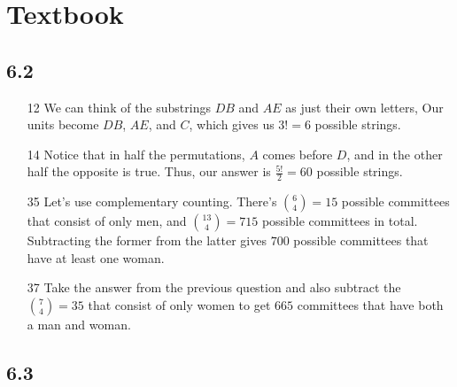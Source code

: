 \documentclass[12pt]{article}
\begin{document}
\section{Textbook}\label{sec:textbook}

\subsection*{6.2}\label{sec:6.2}

\begin{enumerate}
    \item[12] We can think of the substrings $DB$ and $AE$ as just their own letters,
        Our units become $DB$, $AE$, and $C$, which gives us $3! = \boxed{6}$ possible strings.
    \item[14] Notice that in half the permutations, $A$ comes before $D$, and in the other half the opposite is true.
        Thus, our answer is $\frac{5!}{2}=\boxed{60}$ possible strings.
    \item[35] Let's use complementary counting.
        There's $\binom{6}{4}=15$ possible committees that consist of only men, and $\binom{13}{4}=715$ possible committees in total.
        Subtracting the former from the latter gives $\boxed{700}$ possible committees that have at least one woman.
    \item[37] Take the answer from the previous question and also subtract the $\binom{7}{4}=35$ that consist of only women
        to get $\boxed{665}$ committees that have both a man and woman.
\end{enumerate}

\subsection*{6.3}\label{sec:6.3}
\end{document}
